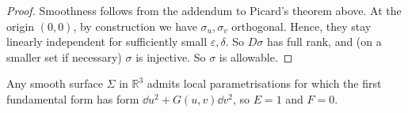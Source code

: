 \begin{proof}
	Smoothness follows from the addendum to Picard's theorem above.
	At the origin \( (0,0) \), by construction we have \( \sigma_u, \sigma_v \) orthogonal.
	Hence, they stay linearly independent for sufficiently small \( \varepsilon, \delta \).
	So \( D\sigma \) has full rank, and (on a smaller set if necessary) \( \sigma \) is injective.
	So \( \sigma \) is allowable.
\end{proof}
\begin{corollary}
	Any smooth surface \( \Sigma \) in \( \mathbb R^3 \) admits local parametrisations for which the first fundamental form has form \( \dd{u}^2 + G(u,v) \dd{v}^2 \), so \( E = 1 \) and \( F = 0 \).
\end{corollary}
